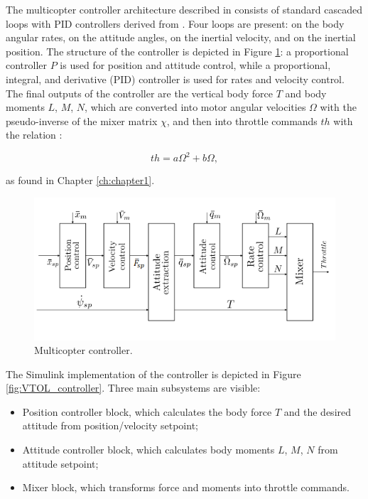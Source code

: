 The multicopter controller architecture described in \cite{battaini2022} consists of standard cascaded loops with PID controllers derived from \cite{px4controller}. Four loops are present: on the body angular rates, on the attitude angles, on the inertial velocity, and on the inertial position. The structure of the controller \cite{Px4AutopilotWebsite} is depicted in Figure \ref{fig:Multicopter_controller}: a proportional controller \(P\) is used for position and attitude control, while a proportional, integral, and derivative (PID) controller is used for rates and velocity control. The final outputs of the controller are the vertical body force \(T\) and body moments \(L\), \(M\), \(N\), which are converted into motor angular velocities \(\Omega\) with the pseudo-inverse of the mixer matrix \(\chi\), and then into throttle commands \(th\) with the relation \cite{Px4DiscussionForum}:

\begin{equation}
    th = a \Omega^2 + b \Omega, \label{eq:throttle}
\end{equation}

as found in Chapter \ref{ch:chapter1}.

\begin{figure}[h]
    \centering
    \includegraphics[width=0.9\linewidth]{Images/Multicopter controller.png}
    \caption{Multicopter controller.}
    \label{fig:Multicopter_controller}
\end{figure}

The Simulink implementation of the controller is depicted in Figure \ref{fig:VTOL_controller}. Three main subsystems are visible:

\begin{itemize}
    \item Position controller block, which calculates the body force \(T\) and the desired attitude from position/velocity setpoint;
    \item Attitude controller block, which calculates body moments \(L\), \(M\), \(N\) from attitude setpoint;
    \item Mixer block, which transforms force and moments into throttle commands.
\end{itemize}


